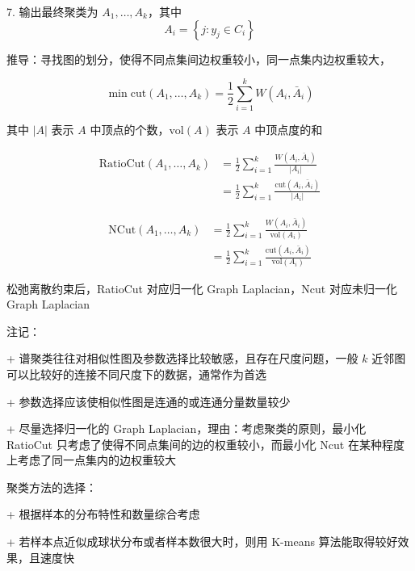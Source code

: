 \documentclass[openany,a4paper,12pt]{ctexbook}
\theoremstyle{kaiti}
\theoremstyle{normal}
\begin{document}
7. 输出最终聚类为 $A_1,\dots ,A_k$，其中 
\begin{equation}
  A_i=\left\{ j:y_j\in C_i \right\}
\end{equation}

推导：寻找图的划分，使得不同点集间边权重较小，同一点集内边权重较大，

\begin{equation}
\min \mathrm{cut}\left(A_1,\dots ,A_k \right)
=\frac{1}{2}\sum_{i=1}^{k}W\left(A_i,\bar{A}_i \right)
\end{equation}

其中 $|A|$ 表示 $A$ 中顶点的个数，$\mathrm{vol}\left(A \right)$ 表示 $A$ 中顶点度的和

\begin{equation}
\begin{aligned}
  \mathrm{RatioCut}\left(A_1,\dots ,A_k \right)
  &=\frac{1}{2}\sum_{i=1}^k{\frac{W\left(A_i,\bar{A}_i \right)}{|A_i|}}\\
  &=\frac{1}{2}\sum_{i=1}^k{\frac{\mathrm{cut}\left(A_i,\bar{A}_i \right)}{|A_i|}}
\end{aligned}
\end{equation}

\begin{equation}
\begin{aligned}
  \mathrm{NCut}\left(A_1,\dots ,A_k \right)
  &=\frac{1}{2}\sum_{i=1}^k{\frac{W\left(A_i,\bar{A}_i \right)}{\mathrm{vol}\left(A_i \right)}}\\
  &=\frac{1}{2}\sum_{i=1}^k{\frac{\mathrm{cut}\left(A_i,\bar{A}_i \right)}{\mathrm{vol}\left(A_i \right)}}
\end{aligned}
\end{equation}

松弛离散约束后，RatioCut 对应归一化 Graph Laplacian，Ncut 对应未归一化 Graph Laplacian

注记：

+ 谱聚类往往对相似性图及参数选择比较敏感，且存在尺度问题，一般 $k$ 近邻图可以比较好的连接不同尺度下的数据，通常作为首选

+ 参数选择应该使相似性图是连通的或连通分量数量较少

+ 尽量选择归一化的 Graph Laplacian，理由：考虑聚类的原则，最小化 RatioCut 只考虑了使得不同点集间的边的权重较小，而最小化 Ncut 在某种程度上考虑了同一点集内的边权重较大

聚类方法的选择：

+ 根据样本的分布特性和数量综合考虑

+ 若样本点近似成球状分布或者样本数很大时，则用 K-means 算法能取得较好效果，且速度快
\end{document}
